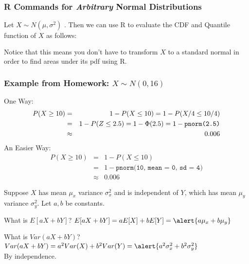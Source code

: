 \documentclass[handout]{beamer}
\begin{document}
\begin{frame}
\frametitle{R Commands for \emph{Arbitrary} Normal Distributions}
Let $X \sim N(\mu, \sigma^2)$ . Then we can use R to evaluate the CDF and Quantile function of $X$ as follows:
\vspace{1em}
\begin{table}
\centering
{}
\end{table}
\vspace{1em}
\alert{Notice that this means you don't have to transform $X$ to a standard normal in order to find areas under its pdf using R.}
\end{frame}
\begin{frame}
\frametitle{Example from Homework: $X \sim N(0,16)$}

One Way:
			\begin{eqnarray*}
				P(X \geq 10) &=&  1 - P(X \leq 10) = 1 - P(X /4\leq 10/4)\\
				&=& 1 - P(Z\leq 2.5) =   1 - \Phi(2.5) =  1 - \mbox{\texttt{pnorm(2.5)}}\\ 
				&\approx& 0.006
			\end{eqnarray*}
\pause
An Easier Way:
	\begin{eqnarray*}
	P(X \geq 10) &=& 1 - P(X \leq 10)\\ 
	&=&  1 - \texttt{pnorm(10, mean = 0, sd = 4)} \\ 
	&\approx& 0.006
	\end{eqnarray*}
\end{frame}
\begin{frame}
Suppose $X$ has mean $\mu_x$ variance $\sigma_x^2$ and is independent of $Y$, which has mean $\mu_y$ variance $\sigma_y^2$. Let $a,b$ be constants.
\vspace{2em}

\begin{block}{What is $E[aX + bY]$?}
\pause
$E[aX + bY]=a E[X] + b E[Y] = \alert{a\mu_x + b\mu_y}$
\end{block}
\vspace{1em}

\begin{block}{What is $Var(aX + bY)$?}
\pause
$Var(aX + bY) = a^2 Var(X) + b^2 Var(Y) = \alert{a^2 \sigma_x^2 + b^2 \sigma_y^2}$
\\\alert{By independence.}
\end{block}

\end{frame}
\end{document}
